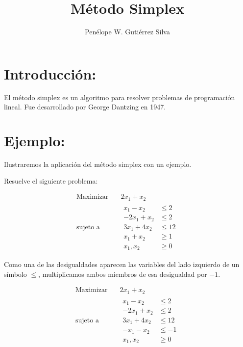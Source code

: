 \documentclass{article}
\title{Método Simplex}
\author{Penélope W. Gutiérrez Silva}
\begin{document}
\maketitle

\section{Introducción:}

El método simplex es un algoritmo para resolver problemas de programación lineal. Fue desarrollado por George Dantzing en 1947.

\section{Ejemplo:}

Ilustraremos la aplicación del método simplex con un ejemplo.

Resuelve el siguiente problema:
 
      \begin{equation*}
 \begin{aligned}
\text{Maximizar} \quad & 2x_{1}+x_{2}\\
\text{sujeto a} \quad &
  \begin{aligned}
   x_{1}-x_{2} &\leq 2\\
   -2x_{1}+x_{2} &\leq 2\\
   3x_{1}+4x_{2} &\leq 12\\
   x_{1}+x_{2} &\geq 1\\
    x_{1},x_{2} &\geq 0
  \end{aligned}
\end{aligned}
\end{equation*}
 
Como una de las desigualdades aparecen las variables  del lado izquierdo de un símbolo $\leq$, multiplicamos ambos miembros de esa desigualdad por $-1$.

     \begin{equation*}
 \begin{aligned}
\text{Maximizar} \quad & 2x_{1}+x_{2}\\
\text{sujeto a} \quad &
  \begin{aligned}
   x_{1}-x_{2} &\leq 2\\
   -2x_{1}+x_{2} &\leq 2\\
   3x_{1}+4x_{2} &\leq 12\\
   -x_{1}-x_{2} &\leq -1\\
    x_{1},x_{2} &\geq 0
  \end{aligned}
\end{aligned}
\end{equation*}
\end{document}
